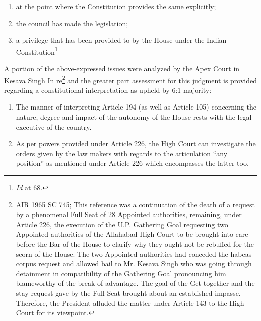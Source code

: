 \begin{multicols}{2}
\vspace{-.2cm}

\begin{enumerate}[label=$\bullet$]
\itemsep=0pt
\item at the point where the Constitution provides the same explicitly;

\item the council has made the legislation;

\item a privilege that has been provided to by the House under the Indian Constitution\footnote{\textit{Id} at 68.}
\end{enumerate}

\vspace{-.2cm}

\noi
A portion of the above-expressed issues were analyzed by the Apex Court in Kesava Singh In
re\footnote{AIR 1965 SC 745; This reference was a continuation of the death of a request by a phenomenal Full Seat of
28 Appointed authorities, remaining, under Article 226, the execution of the U.P. Gathering Goal requesting two
Appointed authorities of the Allahabad High Court to be brought into care before the Bar of the House to clarify
why they ought not be rebuffed for the scorn of the House. The two Appointed authorities had conceded the
habeas corpus request and allowed bail to Mr. Kesava Singh who was going through detainment in compatibility
of the Gathering Goal pronouncing him blameworthy of the break of advantage. The goal of the Get together
and the stay request gave by the Full Seat brought about an established impasse. Therefore, the President alluded
the matter under Article 143 to the High Court for its viewpoint.} and the greater part assessment for this judgment is provided regarding a constitutional interpretation as upheld by 6:1 majority:

\vspace{-.2cm}

\begin{enumerate}[label=$\bullet$]
\itemsep=0pt

\item The manner of interpreting Article 194 (as well as Article 105) concerning the nature,
degree and impact of the autonomy of the House rests with the legal executive of the
country.

\item As per powers provided under Article 226, the High Court can investigate the orders
given by the law makers with regards to the articulation “any position” as mentioned
under Article 226 which encompasses the latter too.


\end{enumerate}
\end{multicols}
